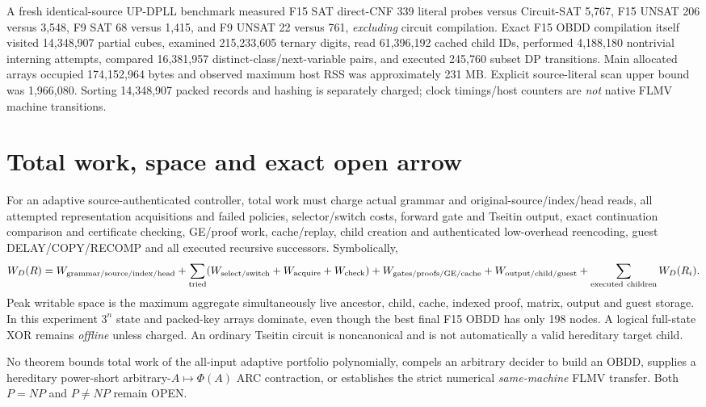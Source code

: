 \documentclass[11pt]{article}
\begin{document}
A fresh identical-source UP-DPLL benchmark measured F15 SAT direct-CNF 339 literal probes versus Circuit-SAT 5,767, F15 UNSAT 206 versus 3,548, F9 SAT 68 versus 1,415, and F9 UNSAT 22 versus 761, \emph{excluding} circuit compilation. Exact F15 OBDD compilation itself visited 14,348,907 partial cubes, examined 215,233,605 ternary digits, read 61,396,192 cached child IDs, performed 4,188,180 nontrivial interning attempts, compared 16,381,957 distinct-class/next-variable pairs, and executed 245,760 subset DP transitions. Main allocated arrays occupied 174,152,964 bytes and observed maximum host RSS was approximately 231 MB. Explicit source-literal scan upper bound was 1,966,080. Sorting 14,348,907 packed records and hashing is separately charged; clock timings/host counters are \emph{not} native FLMV machine transitions.

\section{Total work, space and exact open arrow}
For an adaptive source-authenticated controller, total work must charge actual grammar and original-source/index/head reads, all attempted representation acquisitions and failed policies, selector/switch costs, forward gate and Tseitin output, exact continuation comparison and certificate checking, GE/proof work, cache/replay, child creation and authenticated low-overhead reencoding, guest DELAY/COPY/RECOMP and all executed recursive successors. Symbolically,
\[
 W_D(R)=W_{\rm grammar/source/index/head}+\sum_{\rm tried}(W_{\rm select/switch}+W_{\rm acquire}+W_{\rm check})+W_{\rm gates/proofs/GE/cache}
 +W_{\rm output/child/guest}+\sum_{\rm executed\ children}W_D(R_i).
\]
Peak writable space is the maximum aggregate simultaneously live ancestor, child, cache, indexed proof, matrix, output and guest storage. In this experiment $3^n$ state and packed-key arrays dominate, even though the best final F15 OBDD has only 198 nodes. A logical full-state XOR remains \emph{offline} unless charged. An ordinary Tseitin circuit is noncanonical and is not automatically a valid hereditary target child.

No theorem bounds total work of the all-input adaptive portfolio polynomially, compels an arbitrary decider to build an OBDD, supplies a hereditary power-short arbitrary-$A\mapsto\Phi(A)$ ARC contraction, or establishes the strict numerical \emph{same-machine} FLMV transfer. Both $P=NP$ and $P\ne NP$ remain OPEN.
\end{document}
